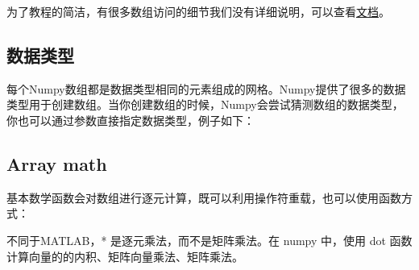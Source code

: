\begin{frame}

为了教程的简洁，有很多数组访问的细节我们没有详细说明，可以查看\href{http://docs.scipy.org/doc/numpy/reference/arrays.indexing.html}{文档}。
\end{frame}

\subsection{数据类型}

\begin{frame}



每个Numpy数组都是数据类型相同的元素组成的网格。Numpy提供了很多的数据类型用于创建数组。当你创建数组的时候，Numpy会尝试猜测数组的数据类型，你也可以通过参数直接指定数据类型，例子如下：


\end{frame}
\subsection{Array math}

\begin{frame}[allowframebreaks]

基本数学函数会对数组进行逐元计算，既可以利用操作符重载，也可以使用函数方式：



\end{frame}


\begin{frame}

不同于MATLAB，* 是逐元乘法，而不是矩阵乘法。在 numpy 中，使用 dot 函数计算向量的的内积、矩阵向量乘法、矩阵乘法。%


\end{frame}


